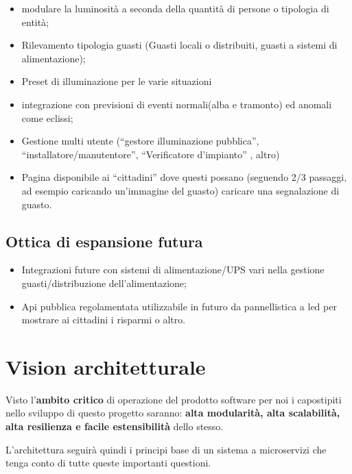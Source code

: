 \documentclass[
]{article}
\begin{document}
\begin{itemize}
\item
  modulare la luminosità a seconda della quantità di persone o tipologia
  di entità;
\item
  Rilevamento tipologia guasti (Guasti locali o distribuiti, guasti a
  sistemi di alimentazione);
\item
  Preset di illuminazione per le varie situazioni
\item
  integrazione con previsioni di eventi normali(alba e tramonto) ed
  anomali come eclissi;
\item
  Gestione multi utente (``gestore illuminazione pubblica'',
  ``installatore/manutentore'', ``Verificatore d'impianto'' , altro)
\item
  Pagina disponibile ai ``cittadini'' dove questi possano (seguendo 2/3
  passaggi, ad esempio caricando un'immagine del guasto) caricare una
  segnalazione di guasto.
\end{itemize}

\hypertarget{ottica-di-espansione-futura}{%
\subsection{Ottica di espansione
futura}\label{ottica-di-espansione-futura}}

\begin{itemize}
\item
  Integrazioni future con sistemi di alimentazione/UPS vari nella
  gestione guasti/distribuzione dell'alimentazione;
\item
  Api pubblica regolamentata utilizzabile in futuro da pannellistica a
  led per mostrare ai cittadini i risparmi o altro.
\end{itemize}

\hypertarget{vision-architetturale}{%
\section{Vision architetturale}\label{vision-architetturale}}

Visto l'\textbf{ambito critico} di operazione del prodotto software per
noi i capostipiti nello sviluppo di questo progetto saranno:
\textbf{alta modularità, alta scalabilità, alta resilienza e facile
estensibilità} dello stesso.

L'architettura seguirà quindi i principi base di un sistema a
microservizi che tenga conto di tutte queste importanti questioni.
\end{document}

